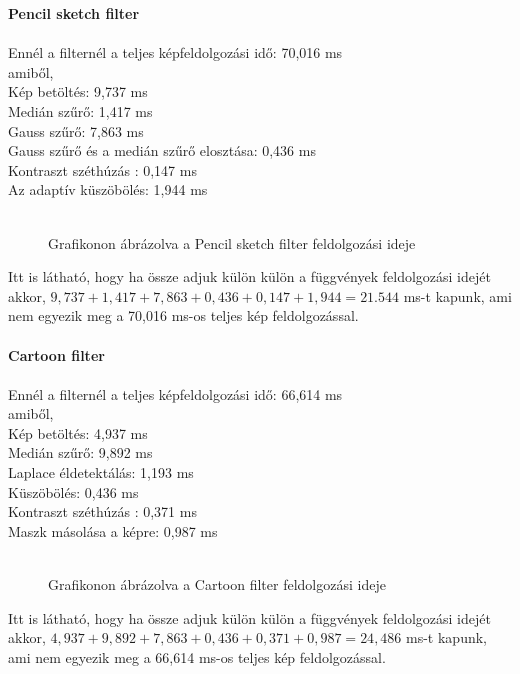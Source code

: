 \textbf{Pencil sketch filter}\\\\
Ennél a filternél a teljes képfeldolgozási idő: 70,016 ms\\
amiből,\\
Kép betöltés: 9,737 ms\\
Medián szűrő: 1,417 ms\\
Gauss szűrő: 7,863 ms\\
Gauss szűrő és a medián szűrő elosztása: 0,436 ms\\
Kontraszt széthúzás : 0,147 ms\\
Az adaptív küszöbölés: 1,944 ms\\\\
\begin{figure}[ht]
\centering
{}
\caption{Grafikonon ábrázolva a Pencil sketch filter feldolgozási ideje} 
\label{fig: graf2}
\end{figure}
\noindent Itt is látható, hogy ha össze adjuk külön külön a függvények feldolgozási idejét akkor, $9,737+1,417+7,863+0,436+0,147+1,944=21.544$ ms-t kapunk, ami nem egyezik meg a 70,016 ms-os teljes kép feldolgozással. \\ \\
\textbf{Cartoon filter}\\\\
Ennél a filternél a teljes képfeldolgozási idő: 66,614 ms\\
amiből,\\
Kép betöltés: 4,937 ms\\
Medián szűrő: 9,892 ms\\
Laplace éldetektálás: 1,193 ms\\
Küszöbölés: 0,436 ms\\
Kontraszt széthúzás : 0,371 ms\\
Maszk másolása a képre: 0,987 ms\\\\
\begin{figure}[ht]
\centering
{}
\caption{Grafikonon ábrázolva a Cartoon  filter feldolgozási ideje} 
\label{fig: graf3}
\end{figure}
\noindent Itt is látható, hogy ha össze adjuk külön külön a függvények feldolgozási idejét akkor, $4,937+9,892+7,863+0,436+0,371+0,987=24,486$ ms-t kapunk, ami nem egyezik meg a 66,614 ms-os teljes kép feldolgozással. \\ \\
